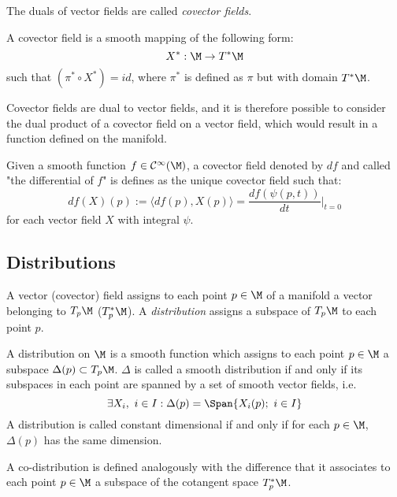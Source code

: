 %
The duals of vector fields are called \textit{covector fields}. 
%
\begin{defn}
	A covector field is a smooth mapping of the following form:
	\begin{equation*}
	X^*:\M\rightarrow T^*\M
	\end{equation*}
	such that $(\pi^*\circ X^*) = id$, where $\pi^*$ is defined as $\pi$ but with domain $T^*\M$.
\end{defn}
%
Covector fields are dual to vector fields, and it is therefore possible to consider the dual product of a covector field on a vector field, which would result in a function defined on the manifold.
%
\begin{defn}[Differential]
	Given a smooth function $f\in\mathcal{C}^\infty(\M)$, a covector field denoted by $df$ and called "the differential of $f$" is defines as the unique covector field such that:
	\begin{equation}
	df(X)(p):=\langle df(p),X(p)\rangle = \frac{df(\psi(p,t))}{dt}{\bigg|}_{t = 0}
	\end{equation}
	for each vector field $X$ with integral $\psi$.
\end{defn}
%
\subsection{Distributions}
%
A vector (covector) field assigns to each point $p\in\M$ of a manifold a vector belonging to $T_p\M$ ($T_p^*\M$). A \textit{distribution} assigns a subspace of $T_p\M$ to each point $p$.
%
\begin{defn}[Distributions]
	A distribution on $\M$ is a smooth function which assigns to each point $p\in\M$ a subspace $\Delta(p)\subset T_p\M$. $\Delta$ is called a smooth distribution if and only if its subspaces in each point are spanned by a set of smooth vector fields, i.e.
	\begin{equation}
	\exists X_i,\text{ }i\in I : \Delta(p) = \Span\{X_i(p);\text{ }i\in I\}
	\end{equation}
	A distribution is called constant dimensional if and only if for each $p\in\M$, $\Delta(p)$ has the same dimension.
\end{defn}
%
A co-distribution is defined analogously with the difference that it associates to each point $p\in\M$ a subspace of the cotangent space $T_p^*\M$. 